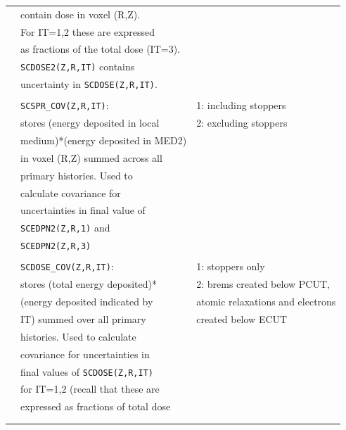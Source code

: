 \documentclass[12pt,twoside]{article}  %
\begin{document}
\begin{longtable}{lll}
         & contain dose in voxel (R,Z). &\\
         & For IT=1,2 these are expressed&\\
         & as fractions of the total dose (IT=3).&\\
         & {\tt SCDOSE2(Z,R,IT)} contains &\\
         & uncertainty in {\tt SCDOSE(Z,R,IT)}.&\\
         &&\\
         & {\tt SCSPR\_COV(Z,R,IT)}: & 1: including stoppers\\
         & stores (energy deposited in local & 2: excluding stoppers\\
         & medium)*(energy deposited in MED2) &\\
         & in voxel (R,Z) summed across all &\\ 
         & primary histories.  Used to &\\
         & calculate covariance for &\\
         & uncertainties in final value of &\\
         & {\tt SCEDPN2(Z,R,1)} and &\\
         & {\tt SCEDPN2(Z,R,3)} &\\
         &&\\
         & {\tt SCDOSE\_COV(Z,R,IT)}: & 1: stoppers only\\
         & stores (total energy deposited)* & 2: brems created below PCUT,\\
         & (energy deposited indicated by & atomic relaxations and electrons\\
         & IT) summed over all primary & created below ECUT\\
         & histories.  Used to calculate &\\
         & covariance for uncertainties in &\\
         & final values of {\tt SCDOSE(Z,R,IT)}&\\
         & for IT=1,2 (recall that these are&\\
         & expressed as fractions of total dose&\\ 
         &&\\
\label{tab:pirs702_scoring_variables}
\end{longtable}
   
    
  
\end{document}
